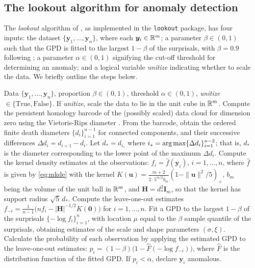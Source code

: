 \subsection{The lookout algorithm for anomaly detection}

The \textit{lookout} algorithm of \cite{lookout}, as implemented in the \texttt{lookout} package, has four inputs: the dataset $\{\bm{y}_1,\dots,\bm{y}_n\}$, where each $\bm{y}_i \in \mathbb{R}^m$; a parameter $\beta \in (0,1)$ such that the GPD is fitted to the largest $1-\beta$ of the surprisals, with $\beta = 0.9$ following \citet{bommier2014peaks}; a parameter $\alpha \in (0,1)$ signifying the cut-off threshold for determining an anomaly; and a logical variable \textit{unitize} indicating whether to scale the data. We briefly outline the steps below.

\begin{algorithm}
  \caption{Lookout algorithm}\label{alg:lookout}
  \begin{algorithmic}[1]
    \Require Data $\{\bm{y}_1, \dots, \bm{y}_n\}$, proportion $\beta \in (0,1)$, threshold $\alpha \in (0,1)$, \emph{unitize} $\in \{\text{True}, \text{False}\}$.
    \State If \textit{unitize}, scale the data to lie in the unit cube in $\mathbb{R}^m$.
    \State Compute the persistent homology barcode of the (possibly scaled) data cloud for dimension zero using the Vietoris-Rips diameter \citep{ghrist2008barcodes}.
    \State From the barcode, obtain the ordered finite death diameters $\{d_i\}_{i = 1}^{n-1}$ for connected components, and their successive differences $\Delta d_i = d_{i+1} - d_i$.
    \State Let $d_* = d_{i_*}$ where $i_* = \text{arg\! max} \{\Delta d_i\}_{i=1}^{n-2}$; that is, $d_*$ is the diameter corresponding to the lower point of the maximum $\Delta d_i$.
    \State Compute the kernel density estimates at the observations: $f_i = \hat{f}(\bm{y}_i)$, $i=1,\dots,n$, where $\hat{f}$ is given by \eqref{eq:mkde} with the kernel $K(\bm{u}) = \frac{m+2}{2\cdot5^{m/2}b_m}(1 - \|\bm{u}\|^2/5)_+$, $b_m$ being the volume of the unit ball in $\mathbb{R}^m$, and $\bm{H} = d_*^2\bm{I}_m$, so that the kernel has support radius $\sqrt5\,d_*$.
    \State Compute the leave-one-out estimates $f_{-i} = \frac{1}{n-1} \big( n f_i - |\bm{H}|^{-1/2} K(\bm{0}) \big)$ for $i=1,\dots,n$.
    \State Fit a GPD to the largest $1-\beta$ of the surprisals $\{-\log f_i\}_{i=1}^n$, with location $\mu$ equal to the $\beta$ sample quantile of the surprisals, obtaining estimates of the scale and shape parameters $(\sigma, \xi)$.
    \State Calculate the probability of each observation by applying the estimated GPD to the leave-one-out estimates: $p_i = (1-\beta)\big(1 - \hat{F}(-\log f_{-i})\big)$, where $\hat{F}$ is the distribution function of the fitted GPD.
    \State If $p_i < \alpha$, declare $\bm{y}_i$ anomalous.
  \end{algorithmic}
\end{algorithm}

